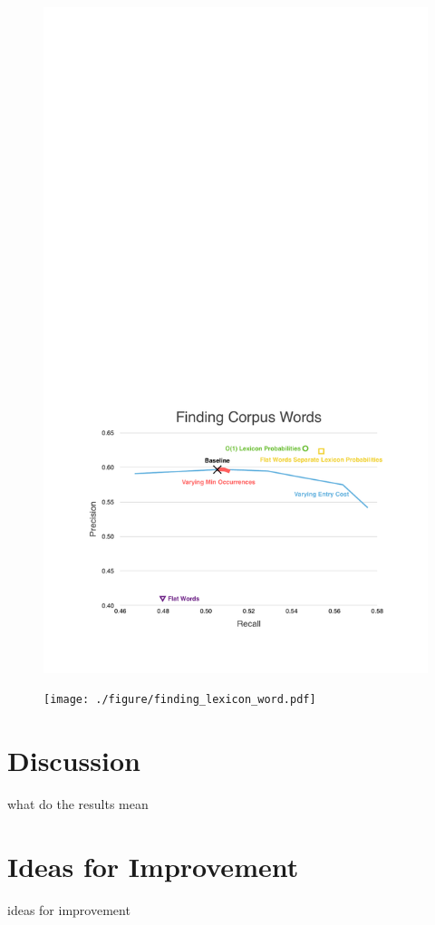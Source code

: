 \documentclass[11pt, oneside, fleqn]{article}
\begin{document}
  \begin{figure}[h]
  \includegraphics{./figure/finding_corpus_word.pdf}
  \end{figure}

  \begin{figure}[h]
  \texttt{[image: ./figure/finding\_lexicon\_word.pdf]}
  \end{figure}

  \section*{Discussion}

  what do the results mean

  \section*{Ideas for Improvement}

  ideas for improvement
\end{document}
